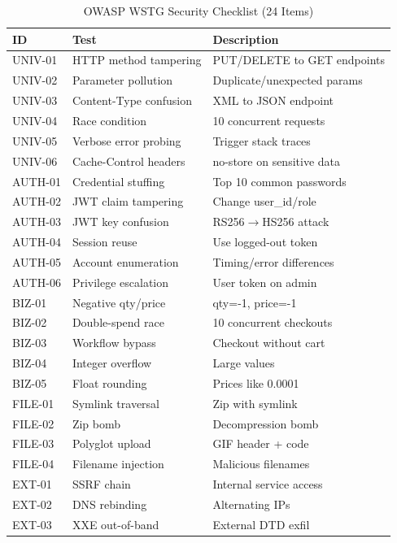 \documentclass[conference,a4paper]{IEEEtran}
\begin{document}
\begin{table}[htbp]
\caption{OWASP WSTG Security Checklist (24 Items)}
\label{tab:checklist}
\centering
\scriptsize
\begin{tabular}{lll}
\toprule
\textbf{ID} & \textbf{Test} & \textbf{Description} \\
\midrule
UNIV-01 & HTTP method tampering & PUT/DELETE to GET endpoints \\
UNIV-02 & Parameter pollution & Duplicate/unexpected params \\
UNIV-03 & Content-Type confusion & XML to JSON endpoint \\
UNIV-04 & Race condition & 10 concurrent requests \\
UNIV-05 & Verbose error probing & Trigger stack traces \\
UNIV-06 & Cache-Control headers & no-store on sensitive data \\
\midrule
AUTH-01 & Credential stuffing & Top 10 common passwords \\
AUTH-02 & JWT claim tampering & Change user\_id/role \\
AUTH-03 & JWT key confusion & RS256$\to$HS256 attack \\
AUTH-04 & Session reuse & Use logged-out token \\
AUTH-05 & Account enumeration & Timing/error differences \\
AUTH-06 & Privilege escalation & User token on admin \\
\midrule
BIZ-01 & Negative qty/price & qty=-1, price=-1 \\
BIZ-02 & Double-spend race & 10 concurrent checkouts \\
BIZ-03 & Workflow bypass & Checkout without cart \\
BIZ-04 & Integer overflow & Large values \\
BIZ-05 & Float rounding & Prices like 0.0001 \\
\midrule
FILE-01 & Symlink traversal & Zip with symlink \\
FILE-02 & Zip bomb & Decompression bomb \\
FILE-03 & Polyglot upload & GIF header + code \\
FILE-04 & Filename injection & Malicious filenames \\
\midrule
EXT-01 & SSRF chain & Internal service access \\
EXT-02 & DNS rebinding & Alternating IPs \\
EXT-03 & XXE out-of-band & External DTD exfil \\
\bottomrule
\end{tabular}
\end{table}
\end{document}
